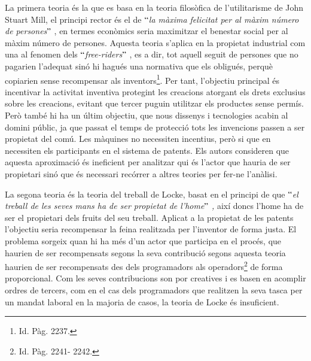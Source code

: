 \documentclass[12pt]{article}
\begin{document}
\vspace{\baselineskip}
\begin{justify}
La primera teoria és la que es basa en la teoria filosòfica de l’utilitarisme de John Stuart Mill, el principi rector és el de $``$\textit{la màxima felicitat per al màxim número de persones}$"$ , en termes econòmics seria maximitzar el benestar social per al màxim número de persones. Aquesta teoria s’aplica en la propietat industrial com una al fenomen dels $``$\textit{free-riders$"$ }, es a dir, tot aquell seguit de persones que no pagarien l’adequat sinó hi hagués una normativa que els obligués, perquè copiarien sense recompensar als inventors\footnote{ Id. Pàg. 2237. }. Per tant, l’objectiu principal és incentivar la activitat inventiva protegint les creacions atorgant els drets exclusius sobre les creacions, evitant que tercer puguin utilitzar els productes sense permís. Però també hi ha un últim objectiu, que nous dissenys i tecnologies acabin al domini públic, ja que passat el temps de protecció tots les invencions passen a ser propietat del comú. Les màquines no necessiten incentius, però si que en necessiten els participants en el sistema de patents. Els autors consideren que aquesta aproximació és ineficient per analitzar qui és l’actor que hauria de ser propietari sinó que és necessari recórrer a altres teories per fer-ne l’anàlisi. 
\end{justify}\par


\vspace{\baselineskip}
\begin{justify}
La segona teoria és la teoria del treball de Locke, basat en el principi de que $``$\textit{el treball de les seves mans ha de ser propietat de l’home$"$ , }així doncs l’home ha de ser el propietari dels fruits del seu treball. Aplicat a la propietat de les patents l’objectiu seria recompensar la feina realitzada per l’inventor de forma justa. El problema sorgeix quan hi ha més d’un actor que participa en el procés, que haurien de ser recompensats segons la seva contribució segons aquesta teoria haurien de ser recompensats des dels programadors als operadors\footnote{ Id. Pàg. 2241- 2242. } de forma proporcional. Com les seves contribucions son por creatives i es basen en acomplir ordres de tercers, com en el cas dels programadors que realitzen la seva tasca per un mandat laboral en la majoria de casos, la teoria de Locke és insuficient.
\end{justify}\par
\end{document}
